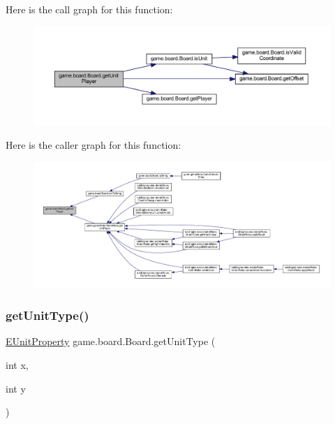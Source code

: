 Here is the call graph for this function\+:
\nopagebreak
\begin{figure}[H]
\begin{center}
\leavevmode
\includegraphics[width=350pt]{classgame_1_1board_1_1_board_a4290038dfff8b88ab1e95a96f5d083b9_cgraph}
\end{center}
\end{figure}
Here is the caller graph for this function\+:
\nopagebreak
\begin{figure}[H]
\begin{center}
\leavevmode
\includegraphics[width=350pt]{classgame_1_1board_1_1_board_a4290038dfff8b88ab1e95a96f5d083b9_icgraph}
\end{center}
\end{figure}
\mbox{\label{classgame_1_1board_1_1_board_a86eddc47b7951c2e74f9acfb5d8ad2e1}} 
\subsubsection{\texorpdfstring{get\+Unit\+Type()}{getUnitType()}\hspace{0.1cm}{\footnotesize\ttfamily [1/2]}}
{\footnotesize\ttfamily \mbox{\hyperlink{enumrule_engine_1_1entity_1_1_e_unit_property}{E\+Unit\+Property}} game.\+board.\+Board.\+get\+Unit\+Type (\begin{DoxyParamCaption}\item[{int}]{x,  }\item[{int}]{y }\end{DoxyParamCaption})\hspace{0.3cm}{\ttfamily [inline]}}



